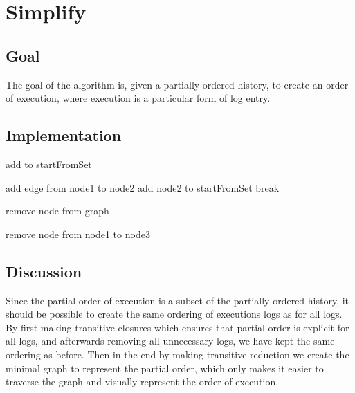 \section{Simplify}
\subsection{Goal} %
The goal of the algorithm is, given a partially ordered history, to create an order of execution, where execution is a particular form of log entry.


\subsection{Implementation} %
\begin{algorithmic}
	\State {}
		    \State add to startFromSet
		\EndIf
	\EndFor
	
	\State {}
	            \State add edge from node1 to node2
	            \State add node2 to startFromSet
	            \State break
	        \EndIf
	    \EndFor
	\EndFor
	
	\State {}
	        \State remove node from graph
	    \EndIf
	\EndFor
	      
	\State {}
	          \State remove node from node1 to node3
	        \EndIf
	      \EndFor
	    \EndIf
	  \EndFor
	\EndFor
\end{algorithmic}
\subsection{Discussion} %
Since the partial order of execution is a subset of the partially ordered history, it should be possible to create the same ordering of executions logs as for all logs. By first making transitive closures which ensures that partial order is explicit for all logs, and afterwards removing all unnecessary logs, we have kept the same ordering as before. Then in the end by making transitive reduction we create the minimal graph to represent the partial order, which only makes it easier to traverse the graph and visually represent the order of execution.

